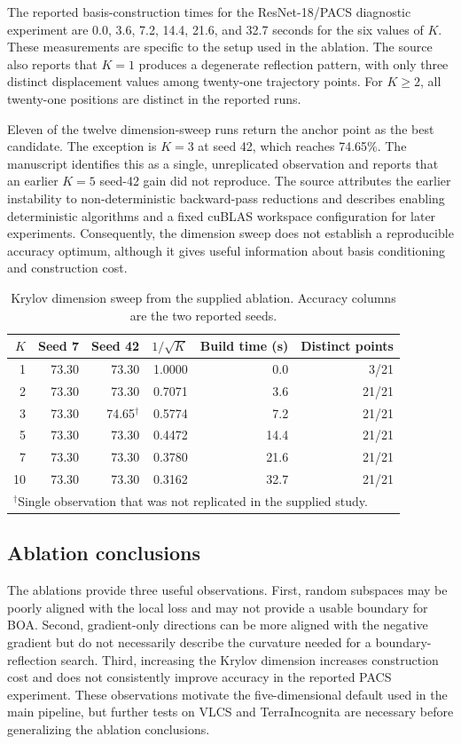 \documentclass[11pt,a4paper]{article}
\begin{document}
The reported basis-construction times for the ResNet-18/PACS diagnostic experiment are 0.0, 3.6, 7.2, 14.4, 21.6, and 32.7 seconds for the six values of $K$. These measurements are specific to the setup used in the ablation. The source also reports that $K=1$ produces a degenerate reflection pattern, with only three distinct displacement values among twenty-one trajectory points. For $K\geq2$, all twenty-one positions are distinct in the reported runs.

Eleven of the twelve dimension-sweep runs return the anchor point as the best candidate. The exception is $K=3$ at seed 42, which reaches 74.65\%. The manuscript identifies this as a single, unreplicated observation and reports that an earlier $K=5$ seed-42 gain did not reproduce. The source attributes the earlier instability to non-deterministic backward-pass reductions and describes enabling deterministic algorithms and a fixed cuBLAS workspace configuration for later experiments. Consequently, the dimension sweep does not establish a reproducible accuracy optimum, although it gives useful information about basis conditioning and construction cost.

\begin{table}[H]
\centering
\caption{Krylov dimension sweep from the supplied ablation. Accuracy columns are the two reported seeds.}
\label{tab:k_sweep}
\small
\begin{tabular}{rrrrrr}
\toprule
$K$ & Seed 7 & Seed 42 & $1/\sqrt{K}$ & Build time (s) & Distinct points \\
\midrule
1 & 73.30 & 73.30 & 1.0000 & 0.0 & 3/21 \\
2 & 73.30 & 73.30 & 0.7071 & 3.6 & 21/21 \\
3 & 73.30 & 74.65$^{\dagger}$ & 0.5774 & 7.2 & 21/21 \\
5 & 73.30 & 73.30 & 0.4472 & 14.4 & 21/21 \\
7 & 73.30 & 73.30 & 0.3780 & 21.6 & 21/21 \\
10 & 73.30 & 73.30 & 0.3162 & 32.7 & 21/21 \\
\bottomrule
\multicolumn{6}{l}{\footnotesize $^{\dagger}$Single observation that was not replicated in the supplied study.}
\end{tabular}
\end{table}

\subsection{Ablation conclusions}
The ablations provide three useful observations. First, random subspaces may be poorly aligned with the local loss and may not provide a usable boundary for BOA. Second, gradient-only directions can be more aligned with the negative gradient but do not necessarily describe the curvature needed for a boundary-reflection search. Third, increasing the Krylov dimension increases construction cost and does not consistently improve accuracy in the reported PACS experiment. These observations motivate the five-dimensional default used in the main pipeline, but further tests on VLCS and TerraIncognita are necessary before generalizing the ablation conclusions.
\end{document}
